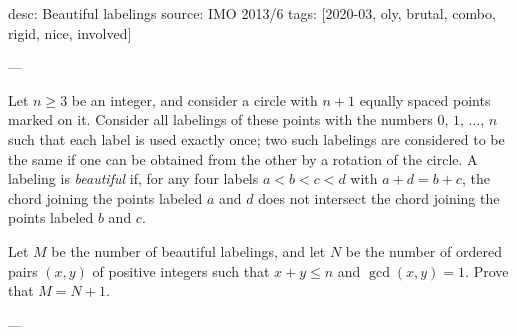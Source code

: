 desc: Beautiful labelings
source: IMO 2013/6
tags: [2020-03, oly, brutal, combo, rigid, nice, involved]

---

Let $n\ge3$ be an integer, and consider a circle with $n+1$ equally spaced points marked on it. Consider all labelings of these points with the numbers $0$, $1$, $\ldots$, $n$ such that each label is used exactly once; two such labelings are considered to be the same if one can be obtained from the other by a rotation of the circle. A labeling is \emph{beautiful} if, for any four labels $a<b<c<d$ with $a+d=b+c$, the chord joining the points labeled $a$ and $d$ does not intersect the chord joining the points labeled $b$ and $c$.

Let $M$ be the number of beautiful labelings, and let $N$ be the number of ordered pairs $(x,y)$ of positive integers such that $x+y\le n$ and $\gcd(x,y)=1$. Prove that $M=N+1$.

---

